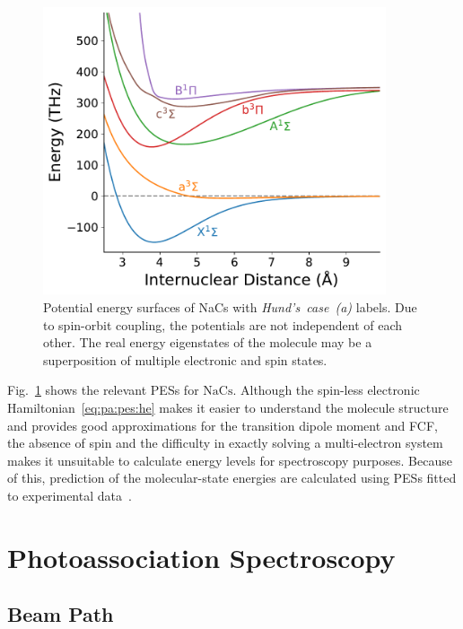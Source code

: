 \begin{figure}
  \centering
  \includegraphics[width=0.9\textwidth]{figures/pa_pes.pdf}
  \caption[NaCs potential energy surfaces]{
    Potential energy surfaces of NaCs with \textit{Hund's~case~(a)} labels.
    Due to spin-orbit coupling, the potentials are not independent of each other.
    The real energy eigenstates of the molecule may be a superposition of multiple
    electronic and spin states.
    \label{fig:pa:pes}}
\end{figure}

Fig.~\ref{fig:pa:pes} shows the relevant PESs for $\mathrm{NaCs}$.
Although the spin-less electronic Hamiltonian~\ref{eq:pa:pes:he} makes it easier
to understand the molecule structure and provides good approximations for the
transition dipole moment and FCF, the absence of spin and the difficulty in exactly solving
a multi-electron system makes it unsuitable to calculate energy levels
for spectroscopy purposes.
Because of this, prediction of the molecular-state energies are calculated using
PESs fitted to experimental data~\cite{docenko_coupling_2006,zaharova_solution_2009,grochola_spin-forbidden_2011,grochola_investigation_2010}.

\section{Photoassociation Spectroscopy}
\label{ch:pa:pa}

\subsection{Beam Path}
\label{ch:pa:beampath}

